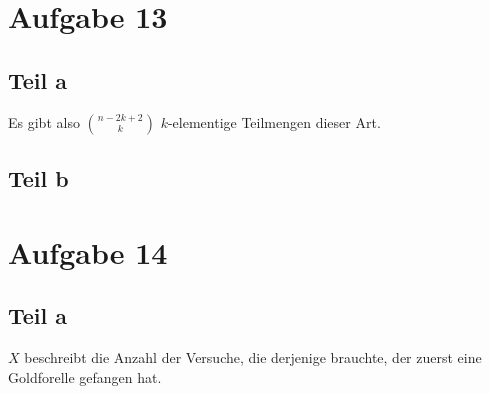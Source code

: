 \documentclass[10pt,a4paper]{article}
\begin{document}
\section{Aufgabe 13}

\subsection{Teil a}
Es gibt also $\binom{n - 2k + 2}{k}$ $k$-elementige Teilmengen dieser Art.

\subsection{Teil b}

\section{Aufgabe 14}

\subsection{Teil a}
$X$ beschreibt die Anzahl der Versuche, die derjenige brauchte, der zuerst eine Goldforelle gefangen hat.
\end{document}
